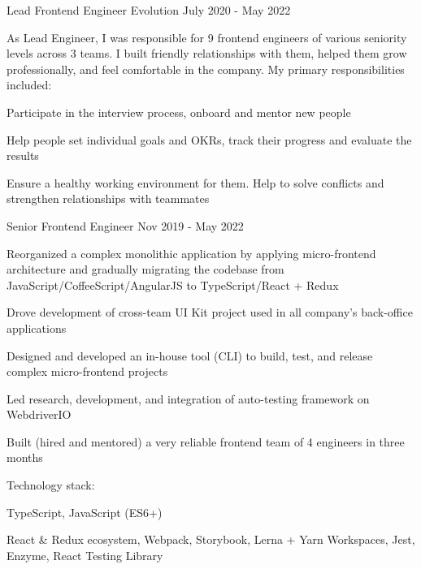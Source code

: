 \begin{cventries}
  \cventry
    {Lead Frontend Engineer} %
    {Evolution} %
    {} %
    {July 2020 - May 2022} %
    {
      As Lead Engineer, I was responsible for 9 frontend engineers of various seniority levels across 3 teams. I built friendly relationships with them, helped them grow professionally, and feel comfortable in the company.
      \newline
      My primary responsibilities included:
      \vspace{4mm}
      \begin{cvitems}
        \item Participate in the interview process, onboard and mentor new people
        \item Help people set individual goals and OKRs, track their progress and evaluate the results
        \item Ensure a healthy working environment for them. Help to solve conflicts and strengthen relationships with teammates
      \end{cvitems}
    }

  \cventry
    {Senior Frontend Engineer} %
    {} %
    {} %
    {Nov 2019 - May 2022} %
    {
      \begin{cvitems} 
        \item Reorganized a complex monolithic application by applying micro-frontend architecture and gradually migrating the codebase from JavaScript/CoffeeScript/AngularJS to TypeScript/React + Redux
        \item Drove development of cross-team UI Kit project used in all company's back-office applications
        \item Designed and developed an in-house tool (CLI) to build, test, and release complex micro-frontend projects
        \item Led research, development, and integration of auto-testing framework on WebdriverIO
        \item Built (hired and mentored) a very reliable frontend team of 4 engineers in three months
      \end{cvitems}
      \vspace{5mm}
      Technology stack:
      \begin{cvstackitems}
        \item TypeScript, JavaScript (ES6+)
        \item React \& Redux ecosystem, Webpack, Storybook, Lerna + Yarn Workspaces, Jest, Enzyme, React Testing Library
      \end{cvstackitems}
      \vspace{-2.0mm}
    }


\end{cventries}
